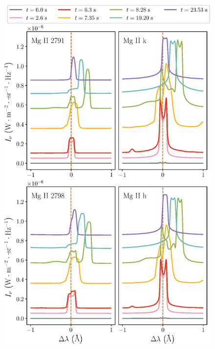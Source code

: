 \begin{figure}[htbp]
	\begin{minipage}[t]{0.48\linewidth}
	\centering
	\includegraphics[width=0.95\linewidth]{figs/5F11_spectra_1_mg}
	\end{minipage}%
	\hfill
	\begin{minipage}[t]{0.48\linewidth}
	\centering

\end{minipage}
\end{figure}
